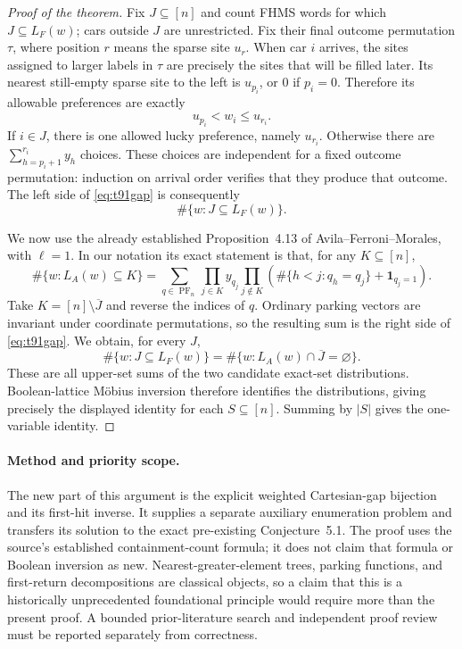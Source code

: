 \documentclass[11pt,a4paper]{article}
\theoremstyle{definition}
\theoremstyle{remark}
\begin{document}
\begin{proof}[Proof of the theorem]
Fix $J\subseteq[n]$ and count FHMS words for which $J\subseteq L_F(w)$;
cars outside $J$ are unrestricted. Fix their final outcome permutation
$\tau$, where position $r$ means the sparse site $u_r$. When car $i$
arrives, the sites assigned to larger labels in $\tau$ are precisely the sites
that will be filled later. Its nearest still-empty sparse site to the left is
$u_{p_i}$, or $0$ if $p_i=0$. Therefore its allowable preferences are
exactly
\[
                        u_{p_i}<w_i\le u_{r_i}.
\]
If $i\in J$, there is one allowed lucky preference, namely $u_{r_i}$.
Otherwise there are $\sum_{h=p_i+1}^{r_i}y_h$ choices. These choices are
independent for a fixed outcome permutation: induction on arrival order
verifies that they produce that outcome. The left side of
\eqref{eq:t91gap} is consequently
\[
                      \#\{w:J\subseteq L_F(w)\}.
\]

We now use the already established Proposition~4.13 of
Avila--Ferroni--Morales, with $\ell=1$. In our notation its exact statement
is that, for any $K\subseteq[n]$,
\[
 \#\{w:L_A(w)\subseteq K\}
 =\sum_{q\in\operatorname{PF}_n}
     \prod_{j\in K}y_{q_j}
     \prod_{j\notin K}
        \left(\#\{h<j:q_h=q_j\}+\mathbf1_{q_j=1}\right).
\]
Take $K=[n]\setminus\overline J$ and reverse the indices of $q$.
Ordinary parking vectors are invariant under coordinate permutations, so
the resulting sum is the right side of \eqref{eq:t91gap}. We obtain, for
every $J$,
\[
 \#\{w:J\subseteq L_F(w)\}
 =\#\{w:L_A(w)\cap\overline J=\varnothing\}.
\]
These are all upper-set sums of the two candidate exact-set
distributions. Boolean-lattice M\"obius inversion therefore identifies
the distributions, giving precisely the displayed identity for each
$S\subseteq[n]$. Summing by $|S|$ gives the one-variable identity.
\end{proof}

\paragraph{Method and priority scope.}
The new part of this argument is the explicit weighted Cartesian-gap
bijection and its first-hit inverse. It supplies a separate auxiliary
enumeration problem and transfers its solution to the exact pre-existing
Conjecture~5.1. The proof uses the source's established containment-count
formula; it does not claim that formula or Boolean inversion as new.
Nearest-greater-element trees, parking functions, and first-return
decompositions are classical objects, so a claim that this is a
historically unprecedented foundational principle would require more
than the present proof. A bounded prior-literature search and independent
proof review must be reported separately from correctness.
\end{document}
